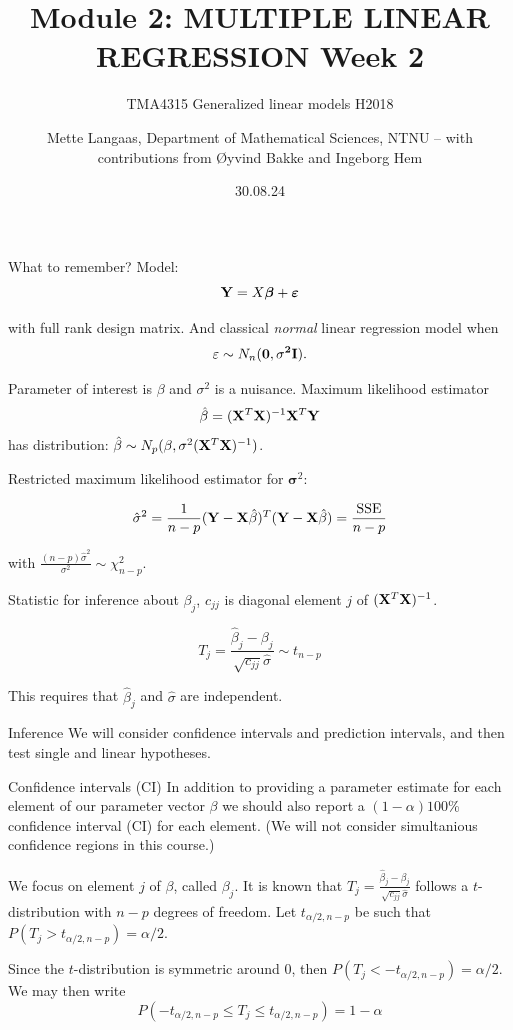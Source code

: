 \documentclass[
  ignorenonframetext,
]{beamer}
\title{Module 2: MULTIPLE LINEAR REGRESSION Week 2}
\subtitle{TMA4315 Generalized linear models H2018}
\author{Mette Langaas, Department of Mathematical Sciences, NTNU -- with
contributions from Øyvind Bakke and Ingeborg Hem}
\date{30.08.24}
\begin{document}
\frame{\titlepage}

\begin{frame}
\begin{block}{What to remember?}
\label{what-to-remember}
Model: \[
{\bf Y}= X {\boldsymbol \beta}+\boldsymbol{\varepsilon}
\]

with full rank design matrix. And classical \emph{normal} linear
regression model when \[\varepsilon\sim N_n(\bf{0},\sigma^2\bf{I}).\]

Parameter of interest is \(\beta\) and \(\sigma^2\) is a nuisance.
Maximum likelihood estimator
\[ \hat\beta=({\bf X}^T{\bf X})^{-1} {\bf X}^T {\bf Y}\] has
distribution:
\(\hat{\beta}\sim N_{p}(\beta,\sigma^2({\bf X}^T{\bf X})^{-1})\).

Restricted maximum likelihood estimator for \({\boldsymbol \sigma}^2\):

\[
\hat{\sigma}^2=\frac{1}{n-p}({\bf Y}-{\bf X}\hat{\beta})^T({\bf Y}-{\bf X}\hat{\beta})=\frac{\text{SSE}}{n-p}
\]

with \(\frac{(n-p)\hat{\sigma}^2}{\sigma^2} \sim \chi^2_{n-p}\).
\end{block}
\end{frame}

\begin{frame}
Statistic for inference about \(\beta_j\), \(c_{jj}\) is diagonal
element \(j\) of \(({\bf X}^T{\bf X})^{-1}\).

\[
T_j=\frac{\hat{\beta}_j-\beta_j}{\sqrt{c_{jj}}\hat{\sigma}}\sim t_{n-p}
\]

This requires that \(\hat{\beta}_j\) and \(\hat{\sigma}\) are
independent.
\end{frame}

\begin{frame}{Inference}
\label{inference}
We will consider confidence intervals and prediction intervals, and then
test single and linear hypotheses.
\end{frame}

\begin{frame}
\begin{block}{Confidence intervals (CI)}
\label{confidence-intervals-ci}
In addition to providing a parameter estimate for each element of our
parameter vector \(\beta\) we should also report a \((1-\alpha)100\)\%
confidence interval (CI) for each element. (We will not consider
simultanious confidence regions in this course.)

We focus on element \(j\) of \(\beta\), called \(\beta_j\). It is known
that \(T_j =\frac{\hat{\beta}_j-\beta_j}{\sqrt{c_{jj}}\hat{\sigma}}\)
follows a \(t\)-distribution with \(n-p\) degrees of freedom. Let
\(t_{\alpha/2,n-p}\) be such that \(P(T_j>t_{\alpha/2,n-p})=\alpha/2\).

Since the \(t\)-distribution is symmetric around 0, then
\(P(T_j< -t_{\alpha/2,n-p})=\alpha/2\). We may then write
\[P(-t_{\alpha/2,n-p}\le T_j \le t_{\alpha/2,n-p})=1-\alpha\]
\end{block}
\end{frame}
\end{document}
